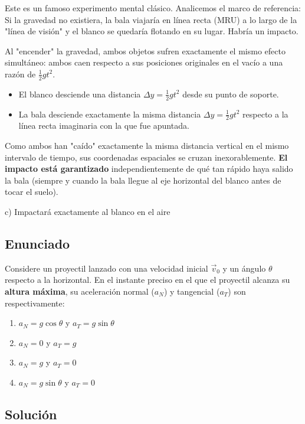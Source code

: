 \documentclass[12pt, a4paper]{article}
\begin{document}
Este es un famoso experimento mental clásico. Analicemos el marco de referencia:
Si la gravedad no existiera, la bala viajaría en línea recta (MRU) a lo largo de la "línea de visión" y el blanco se quedaría flotando en su lugar. Habría un impacto.

Al "encender" la gravedad, ambos objetos sufren exactamente el mismo efecto simultáneo: ambos caen respecto a sus posiciones originales en el vacío a una razón de $\frac{1}{2}gt^2$. 
\begin{itemize}
    \item El blanco desciende una distancia $\Delta y = \frac{1}{2}gt^2$ desde su punto de soporte.
    \item La bala desciende exactamente la misma distancia $\Delta y = \frac{1}{2}gt^2$ respecto a la línea recta imaginaria con la que fue apuntada.
\end{itemize}
Como ambos han "caído" exactamente la misma distancia vertical en el mismo intervalo de tiempo, sus coordenadas espaciales se cruzan inexorablemente. \textbf{El impacto está garantizado} independientemente de qué tan rápido haya salido la bala (siempre y cuando la bala llegue al eje horizontal del blanco antes de tocar el suelo).

\begin{tcolorbox}[colback=green!5!white, colframe=green!50!black, title=Respuesta Final]
\centering \Large c) Impactará exactamente al blanco en el aire
\end{tcolorbox}

\newpage

\subsection*{Enunciado}
Considere un proyectil lanzado con una velocidad inicial $\vec{v}_0$ y un ángulo $\theta$ respecto a la horizontal. En el instante preciso en el que el proyectil alcanza su \textbf{altura máxima}, su aceleración normal ($a_N$) y tangencial ($a_T$) son respectivamente:
\begin{enumerate}[label=\alph*)]
    \item $a_N = g \cos\theta$ y $a_T = g \sin\theta$
    \item $a_N = 0$ y $a_T = g$
    \item $a_N = g$ y $a_T = 0$
    \item $a_N = g \sin\theta$ y $a_T = 0$
\end{enumerate}

\subsection*{Solución}
\end{document}
